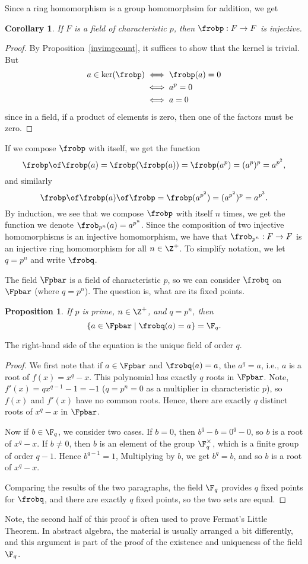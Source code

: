 \documentclass[12pt]{amsart}
\theoremstyle{plain}
\newtheorem{prop}[thm]{Proposition}
\newtheorem{cor}[thm]{Corollary}
\theoremstyle{definition}
\theoremstyle{remark}
\begin{document}
Since a ring homomorphism is a group homomorphsim for addition, we get
\begin{cor}
  If $F$ is a field of characteristic $p$, then $\frobp:F\to F$ is
  injective.
\end{cor}
\begin{proof}
  By Proposition~\ref{invimgcount}, it suffices to show that the
  kernel is trivial.  But
\begin{align*}
  a\in \ker(\frobp) &\iff \frobp(a)=0 \\
  &\iff a^p=0 \\
  &\iff a=0
\end{align*}
since in a field, if a product of elements is zero, then one of the
factors must be zero.
\end{proof}
If we compose $\frobp$ with itself, we get the function
\[\frobp \of \frobp(a) =\frobp(\frobp(a)) =\frobp(a^p)=(a^p)^p=a^{p^2},\]
and similarly
\[\frobp \of \frobp(a)\of\frobp =\frobp(a^{p^2})
=(a^{p^2})^p=a^{p^3}.\]
By induction, we see that we compose $\frobp$ with itself $n$ times,
we get the function we denote $\frob_{p^n}(a)=a^{p^n}$.
Since the composition of two injective homomorphisms is an injective
homomorphism, we have that $\frob_{p^n}:F\to F$ is an injective ring
homomorphism for all $n\in\Z^+$.  To simplify notation, we let $q=p^n$
and write $\frobq$.

The field $\Fpbar$ is a field of characteristic $p$, so we can consider
$\frobq$ on $\Fpbar$ (where $q=p^n$).  The question is, what are its
fixed points.
\begin{prop}
  If $p$ is prime, $n\in\Z^+$, and $q=p^n$, then 
  \[ \{a\in \Fpbar\mid \frobq(a)=a\}=\F_{q}.\]
\end{prop}
The right-hand side of the equation is the unique field of order $q$.
\begin{proof}
  We first note that if $a\in \Fpbar$ and $\frobq(a)=a$, the $a^q=a$,
  i.e., $a$ is a root of $f(x)=x^q-x$.  This polynomial has exactly $q$
  roots in $\Fpbar$.  Note, $f'(x)=qx^{q-1}-1=-1$ ($q=p^n=0$ as a
  multiplier in characteristic $p$), so $f(x)$ and $f'(x)$ have no
  common roots.  Hence, there are exactly $q$ distinct roots of
  $x^q-x$ in $\Fpbar$.

  Now if $b\in \F_q$, we consider two cases.  If $b=0$, then
  $b^q-b=0^q-0$, so $b$ is a root of $x^q-x$.  If $b\neq 0$, then $b$
  is an element of the group $\F_q^\times$, which is a finite group of
  order $q-1$.  Hence $b^{q-1}=1$,  Multiplying by $b$, we get
  $b^q=b$, and so $b$ is a root of $x^q-x$.

  Comparing the results of the two paragraphs, the field $\F_q$
  provides $q$ fixed points for $\frobq$, and there are exactly $q$
  fixed points, so the two sets are equal.
\end{proof}
Note, the second half of this proof is often used to prove Fermat's
Little Theorem.  In abstract algebra, the material is usually arranged
a bit differently, and this argument is part of the proof of the
existence and uniqueness of the field $\F_q$.
\end{document}
